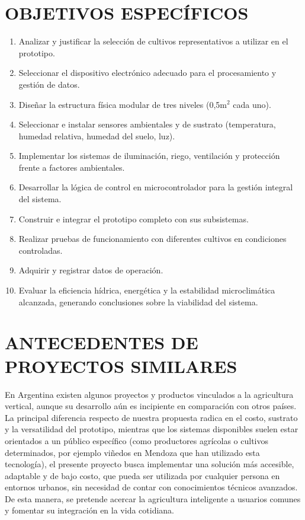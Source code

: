 \section*{OBJETIVOS ESPECÍFICOS}
\begin{enumerate}
  \item Analizar y justificar la selección de cultivos representativos a utilizar en el prototipo.
  \item Seleccionar el dispositivo electrónico adecuado para el procesamiento y gestión de datos.
  \item Diseñar la estructura física modular de tres niveles (0,5m$^2$ cada uno).
  \item Seleccionar e instalar sensores ambientales y de sustrato (temperatura, humedad relativa, humedad del suelo, luz).
  \item Implementar los sistemas de iluminación, riego, ventilación y protección frente a factores ambientales.
  \item Desarrollar la lógica de control en microcontrolador para la gestión integral del sistema.
  \item Construir e integrar el prototipo completo con sus subsistemas.
  \item Realizar pruebas de funcionamiento con diferentes cultivos en condiciones controladas.
  \item Adquirir y registrar datos de operación.
  \item Evaluar la eficiencia hídrica, energética y la estabilidad microclimática alcanzada, generando conclusiones sobre la viabilidad del sistema.
\end{enumerate}

\section*{ANTECEDENTES DE PROYECTOS SIMILARES}
En Argentina existen algunos proyectos y productos vinculados a la agricultura vertical, aunque su desarrollo aún es incipiente en comparación con otros países. La principal diferencia respecto de nuestra propuesta radica en el costo, sustrato y la versatilidad del prototipo, mientras que los sistemas disponibles suelen estar orientados a un público específico (como productores agrícolas o cultivos determinados, por ejemplo viñedos en Mendoza que han utilizado esta tecnología), el presente proyecto busca implementar una solución más accesible, adaptable y de bajo costo, que pueda ser utilizada por cualquier persona en entornos urbanos, sin necesidad de contar con conocimientos técnicos avanzados. De esta manera, se pretende acercar la agricultura inteligente a usuarios comunes y fomentar su integración en la vida cotidiana.

